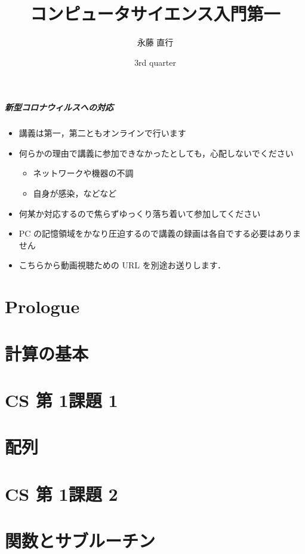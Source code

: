\documentclass[final,c]{beamer}
\title[elementaryCS-1st]{コンピュータサイエンス入門第一}
\date[3rd quarter]{3rd quarter}
\author[Naoyuki Nagatou]{永藤 直行}
\institute[TITECH]{東京工業大学}
\begin{document}
\begin{frame}
\frametitle{新型コロナウィルスへの対応}
  \begin{itemize}
\item 講義は第一，第二ともオンラインで行います
\item 何らかの理由で講義に参加できなかったとしても，心配しないでください
    \begin{itemize}
\item ネットワークや機器の不調
\item 自身が感染，などなど
    \end{itemize}
\item 何某か対応するので焦らずゆっくり落ち着いて参加してください
\item PC の記憶領域をかなり圧迫するので講義の録画は各自でする必要はありません
\item こちらから動画視聴ための URL を別途お送りします．
  \end{itemize}
\end{frame}
\frame{\titlepage}
%
%
\part{Prologue}


%
%

%
%
\part{計算の基本}

%

\part{CS 第 1\textemdash 課題 1}

%
%
\part{配列}

%
%
\part{CS 第 1\textemdash 課題 2}


\part{関数とサブルーチン}

%
%
%
\end{document}
